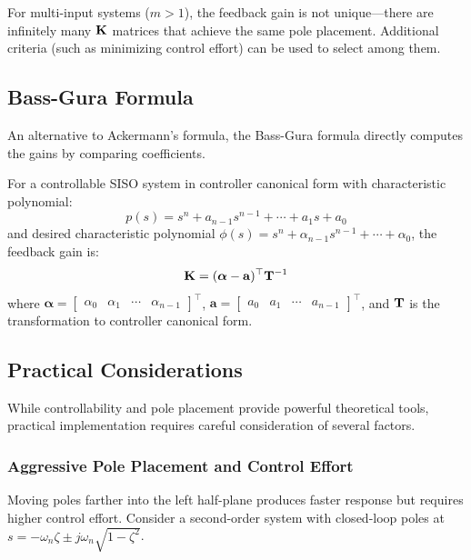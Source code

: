 \begin{remark}
For multi-input systems ($m > 1$), the feedback gain is not unique---there are infinitely many $\mathbf{K}$ matrices that achieve the same pole placement. Additional criteria (such as minimizing control effort) can be used to select among them.
\end{remark}

\subsection{Bass-Gura Formula}

An alternative to Ackermann's formula, the Bass-Gura formula directly computes the gains by comparing coefficients.

\begin{theorem}
For a controllable SISO system in controller canonical form with characteristic polynomial:
\begin{equation}
p(s) = s^n + a_{n-1}s^{n-1} + \cdots + a_1 s + a_0
\end{equation}
and desired characteristic polynomial $\phi(s) = s^n + \alpha_{n-1}s^{n-1} + \cdots + \alpha_0$, the feedback gain is:
\begin{equation}
\mathbf{K} = (\boldsymbol{\alpha} - \mathbf{a})^\top \mathbf{T}^{-1}
\end{equation}
where $\boldsymbol{\alpha} = \begin{bmatrix} \alpha_0 & \alpha_1 & \cdots & \alpha_{n-1} \end{bmatrix}^\top$, $\mathbf{a} = \begin{bmatrix} a_0 & a_1 & \cdots & a_{n-1} \end{bmatrix}^\top$, and $\mathbf{T}$ is the transformation to controller canonical form.
\end{theorem}

\subsection{Practical Considerations}

While controllability and pole placement provide powerful theoretical tools, practical implementation requires careful consideration of several factors.

\subsubsection{Aggressive Pole Placement and Control Effort}

Moving poles farther into the left half-plane produces faster response but requires higher control effort. Consider a second-order system with closed-loop poles at $s = -\omega_n\zeta \pm j\omega_n\sqrt{1-\zeta^2}$.

